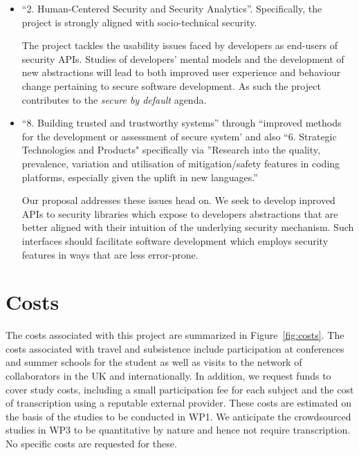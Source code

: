 \documentclass[10pt]{article}
\begin{document}
\begin{itemize}

\item ``2. Human-Centered Security and Security Analytics''. Specifically, the project is strongly aligned with socio-technical security. 

The project tackles the usability issues faced by developers as end-users of security APIs. Studies of developers' mental models and the development of new abstractions will lead to both improved user experience and behaviour change pertaining to secure software development. As such the project contributes to the \textit{secure by default} agenda.


\item ``8. Building trusted and trustworthy systems'' through ``improved methods for the development or assessment of secure system' and also 
``6. Strategic Technologies and Products" specifically via ''Research into the quality, prevalence, variation and utilisation of mitigation/safety features in coding platforms, especially given the uplift in new languages.'' 

Our proposal addresses these issues head on. We seek to develop inproved APIs to security libraries which expose to developers abstractions that are better aligned with their intuition of the underlying security mechanism.  Such interfaces should facilitate software development which employs security features in ways that are less error-prone. 

\end{itemize} 








 


\section{Costs}
The costs associated with this project are summarized in Figure~\ref{fig:costs}.  
The costs associated with travel and subsistence include participation at conferences and summer schools for the student as well as visits to the network of collaborators in the UK and internationally. In addition, we request funds to cover study costs, including a small participation fee for each subject and the cost of transcription using a reputable external provider. These costs are estimated on the basis of the studies to be conducted in WP1. We anticipate the crowdsourced studies in WP3 to be quantitative by nature and hence not require transcription. No specific costs are requested for these.
\end{document}

